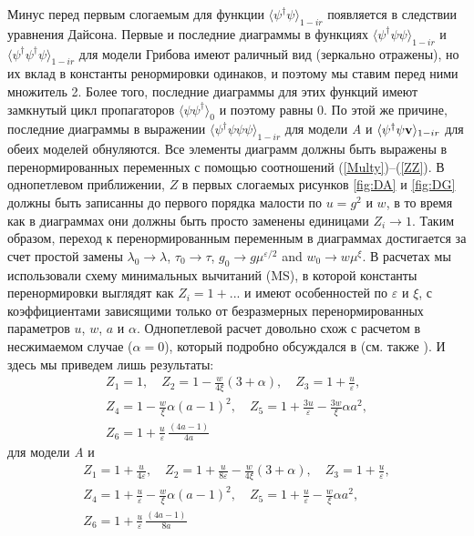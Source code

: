 \documentclass[a4paper,10pt]{article}
\begin{document}
Минус перед первым слогаемым для функции $\langle \psi^{\dag} \psi \rangle_{1-ir}$ появляется в следствии уравнения Дайсона.
Первые и последние диаграммы в функциях
$\langle \psi^{\dag} \psi \psi  \rangle_{1-ir}$ и
$\langle \psi^{\dag} \psi^{\dag} \psi \rangle_{1-ir}$ для модели Грибова
имеют раличный вид (зеркально отражены), но их вклад в константы ренормировки одинаков, и поэтому мы ставим перед ними множитель 2.
Более того, последние диаграммы для этих функций имеют замкнутый цикл пропагаторов $\langle \psi \psi^{\dag} \rangle_{0}$ и поэтому равны $0$.
По этой же причине, последние диаграммы в выражении $\langle \psi^{\dag} \psi \psi \psi  \rangle_{1-ir}$ для модели {\it A}
и $\langle \psi^{\dag}\psi {\bf v} \rangle_{1-ir}$ для обеих моделей обнуляются.
Все элементы диаграмм должны быть выражены в перенормированных переменных с помощью соотношений  (\ref{Multy})--(\ref{ZZ}).
В однопетлевом приближении,  $Z$  в первых слогаемых рисунков  \ref{fig:DA} и  \ref{fig:DG}  должны быть записанны   до первого порядка малости по $u= g^{2}$
и $w$, в то время как в диаграммах они должны быть просто заменены единицами $Z_{i} \to 1$.
Таким образом, переход к перенормированным переменным в диаграммах достигается за счет простой замены $\lambda_{0} \to \lambda$, $\tau_{0} \to \tau$,
$g_{0} \to g\mu^{\varepsilon/2}$ and $w_{0} \to w\mu^{\xi}$.
В расчетах мы использовали схему минимальных вычитаний (MS), в которой константы перенормировки выглядят как  $Z_{i}=1+...$  и имеют  особенностей  по $\varepsilon$ и $\xi$,
с коэффициентами зависящими только от безразмерных  перенормированных параметров $u$, $w$, $a$ и $\alpha$.
Однопетлевой расчет довольно схож с расчетом в несжимаемом случае ($\alpha=0$), который подробно обсуждался в  \cite{AIK} (см. также  \cite{AHH,Alexa}).
 И здесь мы приведем лишь результаты: 
\begin{eqnarray}
Z_{1} = 1, \quad  Z_{2} = 1 - \frac{w}{4\xi}(3+\alpha), \quad
Z_{3} = 1 + \frac{u}{\varepsilon}, \nonumber \\
Z_{4} = 1 - \frac{w}{\xi} \alpha (a-1)^{2} , \quad
Z_{5} = 1 + \frac{3u}{\varepsilon} - \frac{3w}{\xi} \alpha a^{2},
\nonumber \\
Z_{6} = 1 + \frac{u}{\varepsilon}\, \frac{(4a-1)}{4a}
\label{ZoA}
\end{eqnarray}
для модели {\it A} и
\begin{eqnarray}
Z_{1} = 1 + \frac{u}{4\varepsilon}, \quad
Z_{2} = 1 + \frac{u}{8\varepsilon} - \frac{w}{4\xi}(3+\alpha), \quad
Z_{3} = 1 + \frac{u}{\varepsilon}, \nonumber \\
Z_{4} = 1 + \frac{u}{\varepsilon} - \frac{w}{\xi} \alpha (a-1)^{2} , \quad
Z_{5} = 1 + \frac{u}{\varepsilon} - \frac{w}{\xi} \alpha a^{2}, \nonumber \\
Z_{6} = 1 + \frac{u}{\varepsilon}\, \frac{(4a-1)}{8a}
\label{ZoG}
\end{eqnarray}
\end{document}
